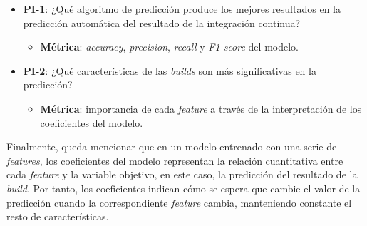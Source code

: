 \begin{itemize}
    \item \textbf{PI-1}: ¿Qué algoritmo de predicción produce los mejores resultados en la
          predicción automática del resultado de la integración continua?\\
          \begin{itemize}
            \item \textbf{Métrica}: \textit{accuracy}, \textit{precision}, \textit{recall} y
                  \textit{F1-score} del modelo.\\
          \end{itemize}

    \item \textbf{PI-2}: ¿Qué características de las \textit{builds} son más significativas en
          la predicción?\\

          \begin{itemize}
            \item \textbf{Métrica}: importancia de cada \textit{feature} a través de la
            interpretación de los coeficientes del modelo.
          \end{itemize}
\end{itemize}

Finalmente, queda mencionar que en un modelo entrenado con una serie de \textit{features}, los
coeficientes del modelo representan la relación cuantitativa entre cada \textit{feature} y la
variable objetivo, en este caso, la predicción del resultado de la \textit{build}. Por tanto, los
coeficientes indican cómo se espera que cambie el valor de la predicción cuando la correspondiente
\textit{feature} cambia, manteniendo constante el resto de características.